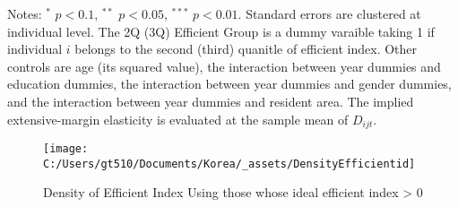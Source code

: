 \documentclass[ review  , 3p ]{elsarticle}
\begin{document}
\begin{table}
\begin{threeparttable}
  \begin{tablenotes}
  \item Notes: $^{*}$ $p < 0.1$, $^{**}$ $p < 0.05$, $^{***}$ $p < 0.01$. Standard errors are clustered at individual level. The 2Q (3Q) Efficient Group is a dummy varaible taking 1 if individual $i$ belongs to the second (third) quanitle of efficient index. Other controls are age (its squared value), the interaction between year dummies and education dummies, the interaction between year dummies and gender dummies, and the interaction between year dummies and resident area. The implied extensive-margin elasticity is evaluated at the sample mean of $D_{ijt}$.
  \end{tablenotes}
  \end{threeparttable}
  \end{table}
  
  \begin{figure}
  
  {\centering \texttt{[image: C:/Users/gt510/Documents/Korea/\_assets/DensityEfficientid]} 
  
  }
  
  \caption{Density of Efficient Index Using those whose ideal efficient index > 0}\label{fig:unnamed-chunk-6}
  \end{figure}
  
\end{document}
